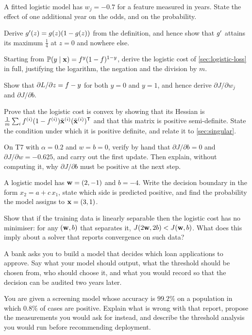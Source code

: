 \sq A fitted logistic model has $w_j = -0.7$ for a feature measured in years.
State the effect of one additional year on the odds, and on the probability.


\ap Derive $g'(z) = g(z)(1-g(z))$ from the definition, and hence show
that $g'$ attains its maximum $\tfrac14$ at $z=0$ and nowhere else.

\ap Starting from $\mathbb{P}(y\mid\mathbf{x}) = f^{y}(1-f)^{1-y}$, derive the logistic cost
of \cref{sec:logistic-loss} in full, justifying the logarithm, the negation and
the division by $m$.

\ap Show that $\partial L/\partial z = f - y$ for both $y=0$ and $y=1$, and
hence derive $\partial J/\partial w_j$ and $\partial J/\partial b$.

\ap Prove that the logistic cost is convex by showing that its Hessian is
$\frac1m\sum_i f^{(i)}(1-f^{(i)})\tilde{\mathbf{x}}^{(i)}(\tilde{\mathbf{x}}^{(i)})^{\mathsf{T}}$
and that this matrix is positive semi-definite. State the condition under which
it is positive definite, and relate it to \cref{sec:singular}.

\ap On T7 with $\alpha = 0.2$ and $w = b = 0$, verify by hand that
$\partial J/\partial b = 0$ and $\partial J/\partial w = -0.625$, and carry out
the first update. Then explain, without computing it, why
$\partial J/\partial b$ must be positive at the next step.

\ap A logistic model has $\mathbf{w} = (2,-1)$ and $b = -4$. Write the decision boundary
in the form $x_2 = a + c\,x_1$, state which side is predicted positive, and find
the probability the model assigns to $\mathbf{x} = (3, 1)$.

\ap Show that if the training data is linearly separable then the logistic cost
has no minimiser: for any $(\mathbf{w},b)$ that separates it, $J(2\mathbf{w}, 2b) < J(\mathbf{w},b)$.
What does this imply about a solver that reports convergence on such data?


\dpr A bank asks you to build a model that decides which loan applications to
approve. Say what your model should output, what the threshold should be chosen
from, who should choose it, and what you would record so that the decision can
be audited two years later.

\dpr You are given a screening model whose accuracy is $99.2\%$ on a population
in which $0.8\%$ of cases are positive. Explain what is wrong with that report,
propose the measurements you would ask for instead, and describe the threshold
analysis you would run before recommending deployment.

